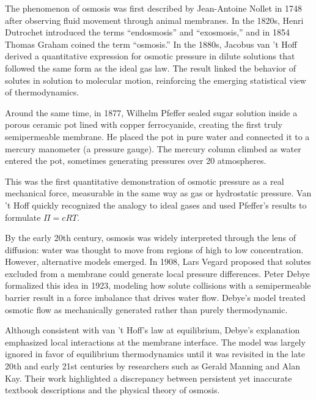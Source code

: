 \begin{historical}
The phenomenon of osmosis was first described by Jean-Antoine Nollet in 1748 after observing fluid movement through animal membranes. In the 1820s, Henri Dutrochet introduced the terms “endosmosis” and “exosmosis,” and in 1854 Thomas Graham coined the term “osmosis.” In the 1880s, Jacobus van 't Hoff derived a quantitative expression for osmotic pressure in dilute solutions that followed the same form as the ideal gas law. The result linked the behavior of solutes in solution to molecular motion, reinforcing the emerging statistical view of thermodynamics.

Around the same time, in 1877, Wilhelm Pfeffer sealed sugar solution inside a porous ceramic pot lined with copper ferrocyanide, creating the first truly semipermeable membrane. He placed the pot in pure water and connected it to a mercury manometer (a pressure gauge). The mercury column climbed as water entered the pot, sometimes generating pressures over 20 atmospheres.

This was the first quantitative demonstration of osmotic pressure as a real mechanical force, measurable in the same way as gas or hydrostatic pressure. Van 't Hoff quickly recognized the analogy to ideal gases and used Pfeffer's results to formulate $\Pi = cRT$.

By the early 20th century, osmosis was widely interpreted through the lens of diffusion: water was thought to move from regions of high to low concentration. However, alternative models emerged. In 1908, Lars Vegard proposed that solutes excluded from a membrane could generate local pressure differences. Peter Debye formalized this idea in 1923, modeling how solute collisions with a semipermeable barrier result in a force imbalance that drives water flow. Debye's model treated osmotic flow as mechanically generated rather than purely thermodynamic.

Although consistent with van ’t Hoff’s law at equilibrium, Debye’s explanation emphasized local interactions at the membrane interface. The model was largely ignored in favor of equilibrium thermodynamics until it was revisited in the late 20th and early 21st centuries by researchers such as Gerald Manning and Alan Kay. Their work highlighted a discrepancy between persistent yet inaccurate textbook descriptions and the physical theory of osmosis.
\end{historical}
